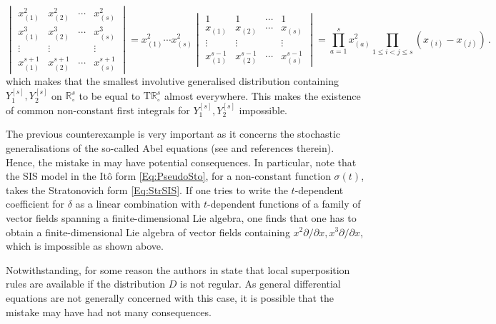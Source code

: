 \documentclass[11pt]{article}
\theoremstyle{plain}
\theoremstyle{definition}
\newcommand{\T}{\mathrm{T}}
\begin{document}
$$
    \begin{vmatrix}
        x_{(1)}^2 & x_{(2)}^2 & \cdots & x_{(s)}^2 \\
        x_{(1)}^3 & x_{(2)}^3 & \cdots & x_{(s)}^3 \\
        \vdots & \vdots & & \vdots \\
        x_{(1)}^{s+1} & x_{(2)}^{s+1} & \cdots & x_{(s)}^{s+1}
    \end{vmatrix} = x_{(1)}^2\dotsb x_{(s)}^2 \begin{vmatrix}
        1 & 1 & \cdots & 1 \\
        x_{(1)} & x_{(2)} & \cdots & x_{(s)} \\
        \vdots & \vdots & & \vdots \\
        x_{(1)}^{s-1} & x_{(2)}^{s-1} & \cdots & x_{(s)}^{s-1}
    \end{vmatrix} = \prod_{a = 1}^s x_{(a)}^2 \prod_{1\leq i < j \leq s} (x_{(i)} - x_{(j)})\,.
$$
which makes that the smallest involutive generalised distribution containing $ {Y}^{[s]}_1, {Y}^{[s]}_2$ on $\mathbb{R}_\circ^s$ to be equal to $\T \mathbb{R}_\circ^s$ almost everywhere. This makes the existence of common non-constant first integrals for $ {Y}^{[s]}_1, {Y}^{[s]}_2$  impossible.

The previous counterexample is very important as it concerns the stochastic generalisations of the so-called Abel equations (see \cite{CLR11} and references therein). Hence, the mistake in \cite{LO09} may have potential consequences. In particular, note that the SIS model in the It\^{o} form \eqref{Eq:PseudoSto}, for a non-constant function $\sigma(t)$, takes the Stratonovich form \eqref{Eq:StrSIS}. If one tries to write the $t$-dependent coefficient for $\delta$ as a linear combination with $t$-dependent functions of a family of vector fields spanning a finite-dimensional Lie algebra, one finds that one has to obtain a finite-dimensional Lie algebra of vector fields containing $x^2\partial/\partial x,x^3\partial/\partial x$, which is impossible as shown above.


Notwithstanding, for some reason the authors in \cite{LO09} state that local superposition rules are available if the distribution $D$ is not regular. As general differential equations are not generally concerned with this case, it is possible that the mistake may have had not many consequences.
\end{document}
